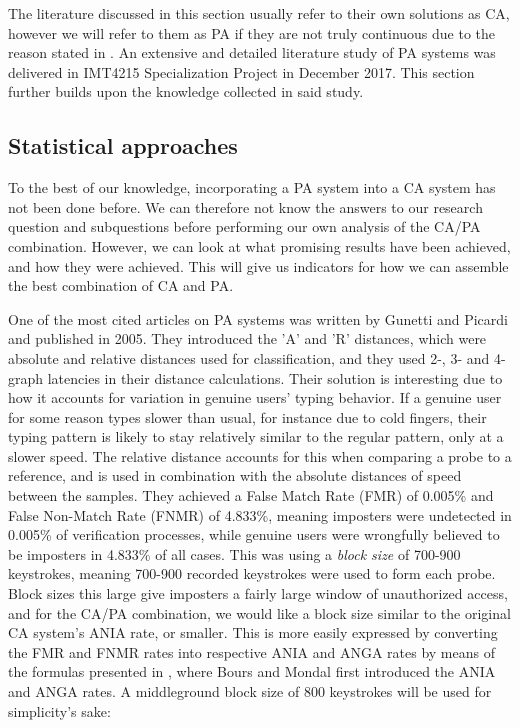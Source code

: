 The literature discussed in this section usually refer to their own solutions as CA, however we will refer to them as PA if they are not truly continuous due to the reason stated in .
An extensive and detailed literature study of PA systems \cite{nilsenSpec} was delivered in IMT4215 Specialization Project in December 2017.
This section further builds upon the knowledge collected in said study.

\subsection{Statistical approaches}
To the best of our knowledge, incorporating a PA system into a CA system has not been done before. 
We can therefore not know the answers to our research question and subquestions before performing our own analysis of the CA/PA combination.
However, we can look at what promising results have been achieved, and how they were achieved.
This will give us indicators for how we can assemble the best combination of CA and PA.

One of the most cited articles on PA systems was written by Gunetti and Picardi \cite{gnp} and published in 2005.
They introduced the 'A' and 'R' distances, which were absolute and relative distances used for classification, and they used 2-, 3- and 4-graph latencies in their distance calculations.
Their solution is interesting due to how it accounts for variation in genuine users' typing behavior.
If a genuine user for some reason types slower than usual, for instance due to cold fingers, their typing pattern is likely to stay relatively similar to the regular pattern, only at a slower speed.
The relative distance accounts for this when comparing a probe to a reference, and is used in combination with the absolute distances of speed between the samples.
They achieved a False Match Rate (FMR) of 0.005\% and False Non-Match Rate (FNMR) of 4.833\%, meaning imposters were undetected in 0.005\% of verification processes, while genuine users were wrongfully believed to be imposters in 4.833\% of all cases. 
This was using a \textit{block size} of 700-900 keystrokes, meaning 700-900 recorded keystrokes were used to form each probe.
Block sizes this large give imposters a fairly large window of unauthorized access, and for the CA/PA combination, we would like a block size similar to the original CA system's ANIA rate, or smaller.
This is more easily expressed by converting the FMR and FNMR rates into respective ANIA and ANGA rates by means of the formulas presented in \cite{CA-performance}, where Bours and Mondal first introduced the ANIA and ANGA rates.
A middleground block size of 800 keystrokes will be used for simplicity's sake:

